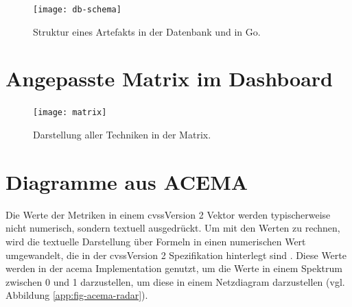 \begin{figure}[!htb]
    \centering
    \texttt{[image: db-schema]}
    \caption{Struktur eines Artefakts in der Datenbank und in Go.}
\end{figure}

\chapter{Angepasste Matrix im Dashboard}
\label{app:matrix}
\begin{figure}[!htb]
    \centering
    \texttt{[image: matrix]}
    \caption{Darstellung aller Techniken in der Matrix.}
\end{figure}

\chapter{Diagramme aus ACEMA}
\label{app:acema-diagrams}
Die Werte der Metriken in einem \gls{cvss}Version 2 Vektor werden typischerweise nicht numerisch, sondern textuell ausgedrückt. Um mit den Werten zu rechnen, wird die textuelle Darstellung über Formeln in einen numerischen Wert umgewandelt, die in der \gls{cvss}Version 2 Spezifikation hinterlegt sind \autocite{CVSSV2Complete}. Diese Werte werden in der \gls{acema} Implementation genutzt, um die Werte in einem Spektrum zwischen 0 und 1 darzustellen, um diese in einem Netzdiagram darzustellen (vgl. Abbildung \ref{app:fig-acema-radar}).
